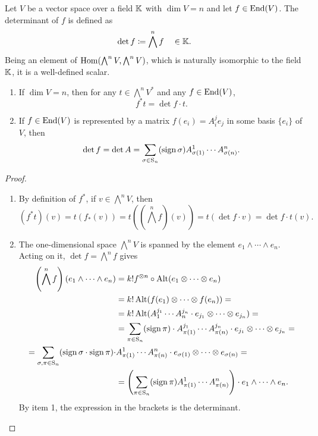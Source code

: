 \begin{defn}
Let $V$ be a vector space over a field $\mathbb{K}$ with $\dim V=n$ and let $f\in\operatorname{End}(V)$. The determinant of $f$ is defined as 
\[\det f\coloneqq \bigwedge^n f\quad \in\mathbb{K}.\] 
Being an element of $\operatorname{Hom}(\bigwedge^n V,\bigwedge^n V)$, which is naturally isomorphic to the field $\mathbb{K}$, it is a well-defined scalar. 
\end{defn}
\begin{prop}
\begin{enumerate}
    \item If $\dim V=n$, then for any $t\in\bigwedge^n V^\ast$ and any $f\in\operatorname{End}(V)$, 
    \[f^\ast t=\det f\cdot t.\]
    \item If $f\in\operatorname{End}(V)$ is represented by a matrix $f(e_i)=A_i^j e_j$ in some basis $\{e_i\}$ of $V$, then
    \[\det f=\det A=\sum_{\sigma\in \mathrm{S}_n}(\operatorname{sign}\sigma)A^1_{\sigma(1)}\cdots A^n_{\sigma(n)}.\]
\end{enumerate}
\end{prop}
\begin{proof}
\begin{enumerate}
    \item By definition of $f^\ast$, if $v\in \bigwedge^n V$, then 
    \[(f^\ast t)(v)=t\left(f_\ast(v)\right)=t\left(\left(\bigwedge^n f\right)(v)\right)=t(\det f\cdot v)=\det f\cdot t(v).\]
    \item The one-dimensional space $\bigwedge^n V$ is spanned by the element $e_1\wedge \cdots \wedge e_n$. Acting on it, $\det f=\bigwedge^n f$ gives
    \begin{align}
        \left(\bigwedge^n f\right)(e_1\wedge \cdots \wedge e_n)&=k!f^{\otimes n}\circ \operatorname{Alt} (e_1\otimes \cdots \otimes e_n)\notag\\
        &=k!\operatorname{Alt}(f(e_1)\otimes\cdots\otimes f(e_n))=\notag
        \\
        &=k! \operatorname{Alt} (A^{j_1}_1 \cdots A^{j_n}_n \cdot e_{j_1}\otimes\cdots \otimes e_{j_n})=\notag\\
        &=\sum_{\pi\in \mathrm{S}_n}(\operatorname{sign}\pi)\cdot A_{\pi(1)}^{j_1}\cdots A_{\pi(n)}^{j_n}\cdot  e_{j_1}\otimes\cdots\otimes e_{j_n}=\notag
        \\
        =\sum_{\sigma,\pi\in \mathrm{S}_n}(\operatorname{sign}\sigma\cdot\operatorname{sign}\pi) \cdot &A_{\pi(1)}^1\cdots A_{\pi(n)}^n\cdot e_{\sigma(1)}\otimes\cdots\otimes e_{\sigma(n)}=\notag
        \\
        &=\left(\sum_{\pi\in \mathrm{S}_n}(\operatorname{sign}\pi)A^1_{\pi(1)}\cdots A^n_{\pi(n)}\right)\cdot e_1\wedge \cdots \wedge e_n.
    \end{align}
    By item 1, the expression in the brackets is the determinant.
\end{enumerate}
\end{proof}

